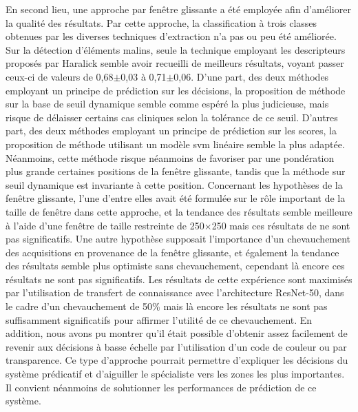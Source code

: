 En second lieu, une approche par fenêtre glissante a été employée afin d'améliorer la qualité des résultats. Par cette approche, la classification à trois classes obtenues par les diverses techniques d'extraction n'a pas ou peu été améliorée. Sur la détection d'éléments malins, seule la technique employant les descripteurs proposés par Haralick semble avoir recueilli de meilleurs résultats, voyant passer ceux-ci de valeurs de \fscore{} 0,68$\pm$0,03 à 0,71$\pm$0,06. D'une part, des deux méthodes employant un principe de prédiction sur les décisions, la proposition de méthode sur la base de seuil dynamique semble comme espéré la plus judicieuse, mais risque de délaisser certains cas cliniques selon la tolérance de ce seuil. D'autres part, des deux méthodes employant un principe de prédiction sur les scores, la proposition de méthode utilisant un modèle \gls{svm} linéaire semble la plus adaptée. Néanmoins, cette méthode risque néanmoins de favoriser par une pondération plus grande certaines positions de la fenêtre glissante, tandis que la méthode sur seuil dynamique est invariante à cette position. Concernant les hypothèses de la fenêtre glissante, l'une d'entre elles avait été formulée sur le rôle important de la taille de fenêtre dans cette approche, et la tendance des résultats semble meilleure à l'aide d’une fenêtre de taille restreinte de 250$\times$250 mais ces résultats de ne sont pas significatifs. Une autre hypothèse supposait l'importance d'un chevauchement des acquisitions en provenance de la fenêtre glissante, et également la tendance des résultats semble plus optimiste sans chevauchement, cependant là encore ces résultats ne sont pas significatifs. Les résultats de cette expérience sont maximisés par l'utilisation de transfert de connaissance avec l'architecture ResNet-50, dans le cadre d'un chevauchement de 50\% mais là encore les résultats ne sont pas suffisamment significatifs pour affirmer l'utilité de ce chevauchement. En addition, nous avons pu montrer qu'il était possible d'obtenir assez facilement de revenir aux décisions à basse échelle par l'utilisation d'un code de couleur ou par transparence. Ce type d'approche pourrait permettre d'expliquer les décisions du système prédicatif et d'aiguiller le spécialiste vers les zones les plus importantes. Il convient néanmoins de solutionner les performances de prédiction de ce système.\par 

